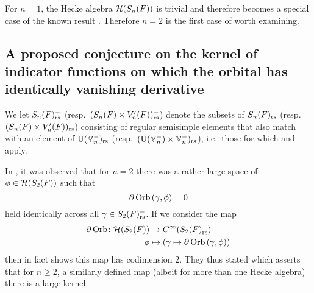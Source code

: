 \begin{remark}
  For $n = 1$, the Hecke algebra $\mathcal H(S_n(F))$ is trivial
  and therefore 
  becomes a special case of the known result \cite{ref:liuFJ}.
  Therefore $n=2$ is the first case of  worth examining.
\end{remark}

\subsection{A proposed conjecture on the kernel of indicator functions on which the orbital has identically vanishing derivative}
\label{sec:intro_large_kernel}

We let $S_n(F)_{\mathrm{rs}}^-$ (resp.\ $(S_n(F) \times V'_n(F))_{\mathrm{rs}}^-$)
denote the subsets of $S_n(F)_{\mathrm{rs}}$ (resp.\ $(S_n(F) \times V'_n(F))_{\mathrm{rs}}$)
consisting of regular semisimple elements that also match with an element of
$\operatorname{U}(\mathbb V_n^-)_{\mathrm{rs}}$ (resp.\ $(\operatorname{U}(\mathbb V_n^-) \times \mathbb V_n^-)_{\mathrm{rs}}$),
i.e.\ those for which 
and  apply.

In \cite{ref:AFLspherical}, it was observed that for $n = 2$
there was a rather large space of $\phi \in \mathcal H(S_2(F))$ such that
\[ \partial \operatorname{Orb} \left(\gamma, \phi \right) = 0 \]
held identically across all $\gamma \in S_2(F)_{\mathrm{rs}}^-$.
If we consider the map
\begin{align*}
  \partial\operatorname{Orb} \colon \mathcal H(S_2(F)) &\to C^\infty(S_2(F)_{\mathrm{rs}}^-) \\
  \phi &\mapsto \left( \gamma \mapsto \partial \operatorname{Orb} \left(\gamma, \phi \right) \right)
\end{align*}
then \cite[Theorem 8.2.3]{ref:AFLspherical} in fact
shows this map has codimension $2$.
They thus stated \cite[Conjecture 1.0.2]{ref:AFLspherical} which asserts that for $n \ge 2$,
a similarly defined map (albeit for more than one Hecke algebra) there is a large kernel.

